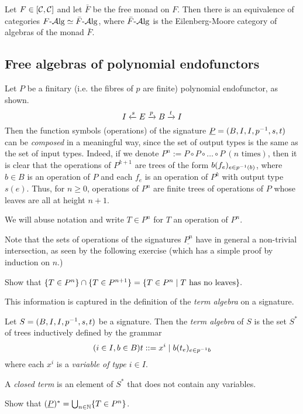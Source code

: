 \begin{proposition}
    Let $F\in\left[\mathcal{C},\mathcal{C}\right]$ and let $\bar{F}$ be the free monad on $F$. Then
    there is an equivalence of categories $F{\text{-} \mathrm{\mathcal{A} lg}}\simeq\bar{F}{\text{-} \mathrm{\mathcal{A} lg}}$, where
    $\bar{F}{\text{-} \mathrm{\mathcal{A} lg}}$ is the Eilenberg-Moore category of algebras of the monad
    $\bar{F}$.
\end{proposition}
\subsection{Free algebras of polynomial endofunctors}
Let $P$ be a finitary (i.e. the fibres of $p$ are finite) polynomial
endofunctor, as shown.
\[
    I\xleftarrow {s} E\xrightarrow {p} B\xrightarrow {t} I
\]
Then the function symbols (operations) of the signature
$\underline{P}=(B,I,I,p^{-1},s,t)$ can be \emph{composed} in a meaningful way,
since the set of output types is the same as the set of input types. Indeed, if
we denote $P^n:=P\circ P\circ\ldots\circ P \ (n \text{ times})$, then it is
clear that the operations of $P^{k+1}$ are trees of the form $b(f_e)_{e\in p^{-1}(b)}$,
where $b\in B$ is an operation of $P$ and each $f_e$ is an operation of $P^k$
with output type $s(e)$. Thus, for $n\geq 0$, operations of $P^n$ are finite
trees of operations of $P$ whose leaves are all at height $n+1$.

We will abuse notation and write $T\in P^n$ for $T$ an operation of $P^n$.

Note that the sets of operations of the signatures $\underline{P^n}$ have in
general a non-trivial intersection, as seen by the following exercise (which has
a simple proof by induction on $n$.)
\begin{exercise} Show that
        $\{ T\in P^n \} \cap \{ T\in P^{n+1} \} = \{ T\in P^n \mid T \text{ has
          no leaves} \}.$
\end{exercise}

This information is captured in the definition of the \emph{term algebra} on a
signature.
\begin{definition}
    Let $S=(B,I,I,p^{-1},s,t)$ be a signature. Then the \emph{term algebra} of
    $S$ is the set $S^*$ of trees inductively defined by the grammar
    \[
        (i\in I,b\in B) t ::= x^i \mid b(t_e)_{e\in p^{-1} b}
    \]
    where each $x^i$ is a \emph{variable of type $i\in I$}.

    A \emph{closed term} is an element of $S^*$ that does not contain any variables.
\end{definition}

\begin{exercise}
    Show that $(\underline{P})^*=\bigcup_{n\in\mathbb{N}} \{ T\in P^n \}$.
\end{exercise}


